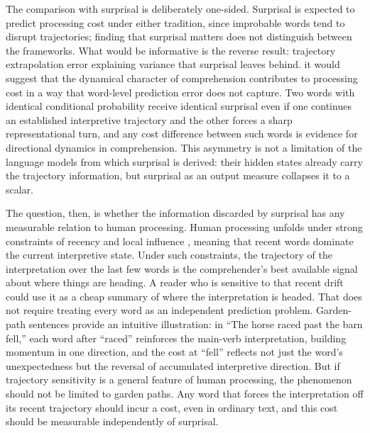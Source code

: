 \documentclass[12pt]{article}
\newcommand{\new}[1]{#1}   %
\begin{document}
The comparison with surprisal is deliberately one-sided. Surprisal is expected to predict processing cost under either tradition, since improbable words tend to disrupt trajectories; finding that surprisal matters does not distinguish between the frameworks. What would be informative is the reverse result: trajectory extrapolation error explaining variance that surprisal leaves behind. it would suggest that the dynamical character of comprehension contributes to processing cost in a way that word-level prediction error does not capture. Two words with identical conditional probability receive identical surprisal even if one continues an established interpretive trajectory and the other forces a sharp representational turn, and any cost difference between such words is evidence for directional dynamics in comprehension. This asymmetry is not a limitation of the language models from which surprisal is derived: their hidden states already carry the trajectory information, but surprisal as an output measure collapses it to a scalar.

\new{The question, then, is whether the information discarded by surprisal has any measurable relation to human processing.} Human processing unfolds under strong constraints of recency and local influence \citep{gibson1998,lewis2005}, meaning that recent words dominate the current interpretive state. Under such constraints, the trajectory of the interpretation over the last few words is the comprehender's best available signal about where things are heading. A reader who is sensitive to that recent drift could use it as a cheap summary of where the interpretation is headed. That does not require treating every word as an independent prediction problem. Garden-path sentences provide an intuitive illustration: in ``The horse raced past the barn fell,'' each word after ``raced'' reinforces the main-verb interpretation, building momentum in one direction, and the cost at ``fell'' reflects not just the word's unexpectedness but the reversal of accumulated interpretive direction. But if trajectory sensitivity is a general feature of human processing, the phenomenon should not be limited to garden paths. Any word that forces the interpretation off its recent trajectory should incur a cost, even in ordinary text, and this cost should be measurable independently of surprisal.
\end{document}
